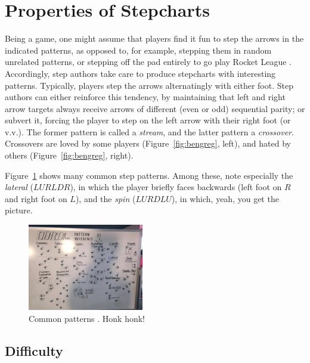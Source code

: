 \documentclass[10pt]{sigplanconf}
\begin{document}

\section{Properties of Stepcharts}

Being a game, one might assume that players find it fun to step the arrows in the indicated patterns, as opposed to, for example, stepping them in random unrelated patterns, or stepping off the pad entirely to go play Rocket League \cite{rocketleague}.
Accordingly, step authors take care to produce stepcharts with interesting patterns.
Typically, players step the arrows alternatingly with either foot.
Step authors can either reinforce this tendency, by maintaining that left and right arrow targets always receive arrows of different (even or odd) sequential parity;
or subvert it, forcing the player to step on the left arrow with their right foot (or v.v.).
The former pattern is called a {\em stream}, and the latter pattern a {\em crossover}. Crossovers are loved by some players (Figure~\ref{fig:bengreg}, left), and hated by others (Figure~\ref{fig:bengreg}, right).

Figure~\ref{fig:patterns} shows many common step patterns.
Among these, note especially the {\em lateral} ($LURLDR$), in which the player briefly faces backwards (left foot on $R$ and right foot on $L$), and the {\em spin} ($LURDLU$), in which, yeah, you get the picture.

\begin{figure}[t]
	\begin{center}
	\includegraphics[width=0.45\textwidth]{patterns.jpg}
	\end{center}
	\caption{Common patterns \cite{patterns}. Honk honk!}
	\label{fig:patterns}
\end{figure}

\subsection{Difficulty}
\end{document}
